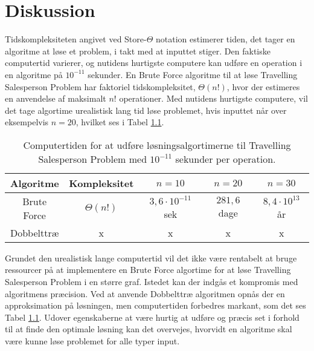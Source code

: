 \chapter{Diskussion}

Tidskompleksiteten angivet ved Store-$\Theta$ notation estimerer tiden, det tager en algoritme at løse et problem, i takt med at inputtet stiger. 
Den faktiske computertid varierer, og nutidens hurtigste computere kan udføre en operation i en algoritme på $10^{-11}$ sekunder.
En Brute Force algoritme til at løse Travelling Salesperson Problem har faktoriel tidskompleksitet, $\Theta(n!)$, hvor der estimeres en anvendelse af maksimalt $n!$ operationer.
Med nutidens hurtigste computere, vil det tage algortime urealistisk lang tid løse problemet, hvis inputtet når over eksempelvis $n=20$, hvilket ses i Tabel \ref{tab_algtsp}.

\begin{table}[h]
 \centering
  \begin{tabular}{|c|c|c|c|c|}
   \hline
   Algoritme & Kompleksitet & $n=10$ & $n=20$ & $n=30$\\
   \hline
   Brute Force & $\Theta(n!)$ & $3,6 \cdot 10^{-11}$ sek & $281,6$ dage & $8,4 \cdot 10^{13}$ år \\
   \hline
   Dobbelttræ & x & x & x & x \\
   \hline
  \end{tabular}
 \caption{Computertiden for at udføre løsningsalgortimerne til Travelling Salesperson Problem med $10^{-11}$ sekunder per operation.} \label{tab_algtsp}
\end{table}

Grundet den urealistisk lange computertid vil det ikke være rentabelt at bruge ressourcer på at implementere en Brute Force algortime for at løse Travelling Salesperson Problem i en større graf. 
Istedet kan der indgås et kompromis med algoritmens præcision. Ved at anvende Dobbelttræ algoritmen opnås der en approksimation på løsningen, men computertiden forbedres markant, som det ses Tabel \ref{tab_algtsp}.  
Udover egenskaberne at være hurtig at udføre og præcis set i forhold til at finde den optimale løsning kan det overvejes, hvorvidt en algoritme skal være kunne løse problemet for alle typer input.